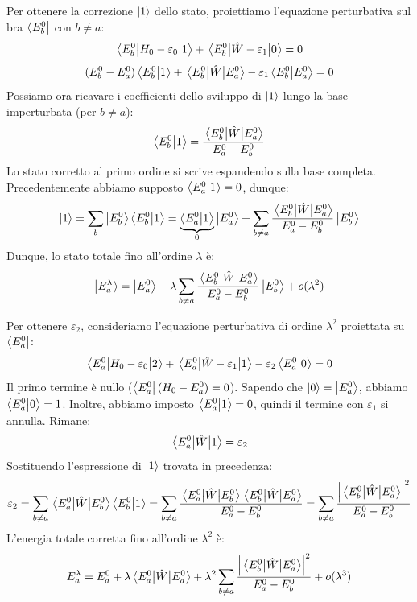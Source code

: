 Per ottenere la correzione \(\ket{1}\) dello stato, proiettiamo l'equazione perturbativa sul bra \(\bra{E_b^0}\) con \(b \neq a\):
\[
    \mel{E_b^0}{H_0 - \varepsilon_0}{1} + \mel{E_b^0}{\hat{W} - \varepsilon_1}{0} = 0
\]
\[
    (E_b^0 - E_a^0) \braket{E_b^0}{1} + \mel{E_b^0}{\hat{W}}{E_a^0} -\varepsilon_1\braket{E_b^0}{E_a^0} = 0
\]
Possiamo ora ricavare i coefficienti dello sviluppo di \(\ket{1}\) lungo la base imperturbata (per \(b \neq a\)):
\begin{equation}
    \braket{E_b^0}{1} = \frac{\mel{E_b^0}{\hat{W}}{E_a^0}}{E_a^0 - E_b^0}
\end{equation}
Lo stato corretto al primo ordine si scrive espandendo sulla base completa. Precedentemente abbiamo supposto \(\braket{E_a^0}{1} = 0\), dunque:
\[
    \ket{1} = \sum_{b} \ket{E_b^0}\braket{E_b^0}{1} = \underbrace{\braket{E_a^0}{1}}_{0} \ket{E_a^0} + \sum_{b \neq a} \frac{\mel{E_b^0}{\hat{W}}{E_a^0}}{E_a^0 - E_b^0} \ket{E_b^0}
\]
Dunque, lo stato totale fino all'ordine \(\lambda\) è:
\begin{equation}
    \ket{E_a^\lambda} = \ket{E_a^0} + \lambda \sum_{b \neq a} \frac{\mel{E_b^0}{\hat{W}}{E_a^0}}{E_a^0 - E_b^0} \ket{E_b^0} + o(\lambda^2)
\end{equation}


Per ottenere \(\varepsilon_2\), consideriamo l'equazione perturbativa di ordine \(\lambda^2\) proiettata su \(\bra{E_a^0}\):
\[
    \mel{E_a^0}{H_0 - \varepsilon_0}{2} + \mel{E_a^0}{\hat{W} - \varepsilon_1}{1} - \varepsilon_2 \braket{E_a^0}{0} = 0
\]
Il primo termine è nullo (\(\bra{E_a^0}(H_0 - E_a^0) = 0\)). Sapendo che \(\ket{0} = \ket{E_a^0}\), abbiamo \(\braket{E_a^0}{0} = 1\). Inoltre, abbiamo imposto \(\braket{E_a^0}{1} = 0\), quindi il termine con \(\varepsilon_1\) si annulla. Rimane:
\[
    \mel{E_a^0}{\hat{W}}{1} = \varepsilon_2
\]
Sostituendo l'espressione di \(\ket{1}\) trovata in precedenza:
\begin{equation}
    \varepsilon_2 = \sum_{b \neq a} \mel{E_a^0}{\hat{W}}{E_b^0} \braket{E_b^0}{1} 
        = \sum_{b \neq a} \frac{\mel{E_a^0}{\hat{W}}{E_b^0} \mel{E_b^0}{\hat{W}}{E_a^0}}{E_a^0 - E_b^0}
        = \sum_{b \neq a} \frac{\abs{\mel{E_b^0}{\hat{W}}{E_a^0}}^2}{E_a^0 - E_b^0}
\end{equation}
L'energia totale corretta fino all'ordine \(\lambda^2\) è:
\begin{equation}
    E_a^\lambda = E_a^0 + \lambda \mel{E_a^0}{\hat{W}}{E_a^0} + \lambda^2 \sum_{b \neq a} \frac{\abs{\mel{E_b^0}{\hat{W}}{E_a^0}}^2}{E_a^0 - E_b^0} + o(\lambda^3)
\end{equation}


